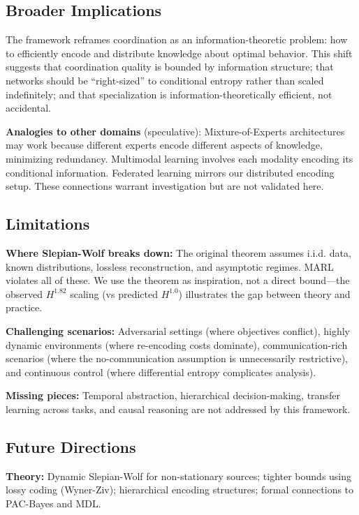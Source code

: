 \documentclass[10pt, letterpaper]{article}
\begin{document}
\subsection{Broader Implications}

The framework reframes coordination as an information-theoretic problem: how to efficiently encode and distribute knowledge about optimal behavior. This shift suggests that coordination quality is bounded by information structure; that networks should be ``right-sized'' to conditional entropy rather than scaled indefinitely; and that specialization is information-theoretically efficient, not accidental.

\textbf{Analogies to other domains} (speculative): Mixture-of-Experts architectures may work because different experts encode different aspects of knowledge, minimizing redundancy. Multimodal learning involves each modality encoding its conditional information. Federated learning mirrors our distributed encoding setup. These connections warrant investigation but are not validated here.

\subsection{Limitations}

\textbf{Where Slepian-Wolf breaks down:} The original theorem assumes i.i.d. data, known distributions, lossless reconstruction, and asymptotic regimes. MARL violates all of these. We use the theorem as inspiration, not a direct bound---the observed $H^{1.82}$ scaling (vs predicted $H^{1.0}$) illustrates the gap between theory and practice.

\textbf{Challenging scenarios:} Adversarial settings (where objectives conflict), highly dynamic environments (where re-encoding costs dominate), communication-rich scenarios (where the no-communication assumption is unnecessarily restrictive), and continuous control (where differential entropy complicates analysis).

\textbf{Missing pieces:} Temporal abstraction, hierarchical decision-making, transfer learning across tasks, and causal reasoning are not addressed by this framework.

\subsection{Future Directions}

\textbf{Theory:} Dynamic Slepian-Wolf for non-stationary sources; tighter bounds using lossy coding (Wyner-Ziv); hierarchical encoding structures; formal connections to PAC-Bayes and MDL.
\end{document}
